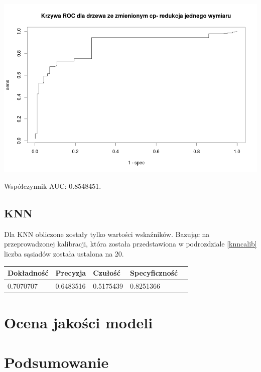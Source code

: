 \documentclass{article}
\begin{document}
\begin{center}
	\includegraphics[scale=0.40]{images/cptree2.png}
\end{center}

Współczynnik AUC: 0.8548451.

\subsection{KNN}

Dla KNN obliczone zostały tylko wartości wskaźników. Bazując na przeprowadzonej kalibracji, która została przedstawiona w podrozdziale \ref{knncalib} liczba sąsiadów została ustalona na 20.\\

\begin{center}
    \begin{tabular}{| l | l | l | l | l|}
    \hline
        Dokładność &  Precyzja &  Czułość & Specyficzność \\ \hline
      	0.7070707 & 0.6483516 & 0.5175439 & 0.8251366  \\
    \hline
    \end{tabular}
\end{center}

\section{Ocena jakości modeli}
\section{Podsumowanie}
\end{document}
